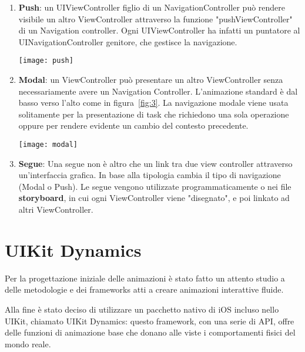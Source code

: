 \begin{enumerate}
    \item{\textbf{Push}: un UIViewController figlio di un NavigationController può rendere
    visibile un altro ViewController attraverso la funzione 
    "pushViewController" di un Navigation controller. Ogni UIViewController ha
    infatti un puntatore al UINavigationController genitore, che gestisce la navigazione.

    \par
    \begin{minipage}{\linewidth}
        \centering
        \texttt{[image: push]}
        \label{fig:2}
    \end{minipage}
    }
    \item{ \textbf{Modal}: un ViewController può presentare un altro ViewController senza necessariamente avere un 
        Navigation Controller. L'animazione standard è dal basso verso l'alto come in figura~\ref{fig:3}. La navigazione modale viene
        usata solitamente per la presentazione di task che richiedono una sola operazione oppure per rendere evidente un cambio del contesto precedente.
        \par
        \begin{minipage}{\linewidth}
            \centering
            \texttt{[image: modal]}
            \label{fig:3}
        \end{minipage}
    }
    \item{\textbf{Segue}: Una segue non è altro che un link tra due view controller attraverso un'interfaccia
        grafica. In base alla tipologia cambia il tipo di navigazione (Modal o Push). Le segue vengono utilizzate programmaticamente o nei file \textbf{storyboard}, in cui
        ogni ViewController viene "disegnato", e poi linkato ad altri ViewController.
    }
\end{enumerate}

\section{UIKit Dynamics}

Per la progettazione iniziale delle animazioni è stato fatto un attento studio a delle metodologie e dei frameworks
atti a creare animazioni interattive fluide.

Alla fine è stato deciso di utilizzare un pacchetto
nativo di iOS incluso nello UIKit\cite{uikit}, chiamato UIKit Dynamics\cite{uidynamics}: questo framework,
con una serie di API, offre delle funzioni di animazione base che 
donano alle viste i comportamenti fisici del mondo reale.

